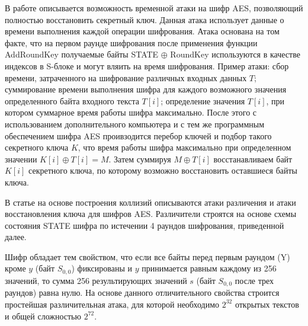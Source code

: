 \documentclass{./civarticle}
\begin{document}
В работе \cite{aes7} описывается возможность временной атаки на шифр AES, позволяющий полностью восстановить секретный ключ. Данная атака использует данные о времени выполнения каждой операции шифрования. Атака основана на том факте, что на первом раунде шифрования после применения функции AddRoundKey получаемые байты STATE $\oplus$ RoundKey используются в качестве индексов в S-блоке и могут вляить на время шифрования. Пример атаки: сбор времени, затраченного на шифрование различных входных данных $T$; суммирование времени выполнения шифра для каждого возможного значения определенного байта входного текста $T[i]$; определение значения $T[i]$, при котором суммарное время работы шифра максимально. После этого с использованием дополнительного компьютера и с тем же программным обеспечением шифра AES проивзодится перебор ключей и подбор такого секретного ключа $K$, что время работы шифра максимально при определенном значении $K[i] \oplus T[i] = M$. Затем суммируя $M \oplus T[i]$ восстанавливаем байт $K[i]$ секретного ключа, по которому возможно восстановить оставшиеся байты ключа.

В статье \cite{aes0} на основе построения коллизий описываются атаки различения и атаки восстановления ключа для шифров AES. Различители строятся на основе схемы состояния STATE шифра по истечении 4 раундов шифрования, приведенной далее.

    \begin{figure}[h!]
    \end{figure}
Шифр обладает тем свойством, что если все байты перед первым раундом (Y) кроме $y$ (байт $S_{0, 0}$) фиксированы и $y$ принимается равным каждому из 256 значений, то сумма 256 результирующих значений $s$ (байт $S_{0, 0}$ после трех раундов) равна нулю. На основе данного отличительного свойства строится простейшая различительная атака, для которой необходимо $2^{32}$ открытых текстов и общей сложностью $2^{72}$.
\end{document}

